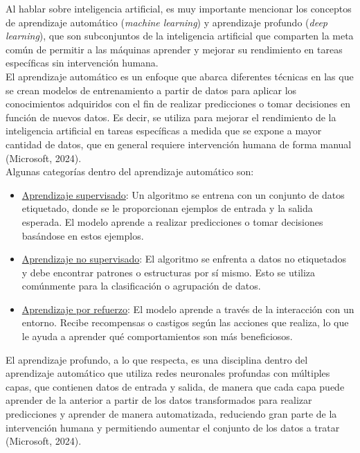 Al hablar sobre inteligencia artificial, es muy importante mencionar los conceptos de aprendizaje automático (\textit{machine learning}) y aprendizaje profundo (\textit{deep learning}), que son subconjuntos de la inteligencia artificial que comparten la meta común de permitir a las máquinas aprender y mejorar su rendimiento en tareas específicas sin intervención humana.\\

El aprendizaje automático es un enfoque que abarca diferentes técnicas en las que se crean modelos de entrenamiento a partir de datos para aplicar los conocimientos adquiridos con el fin de realizar predicciones o tomar decisiones en función de nuevos datos. Es decir, se utiliza para mejorar el rendimiento de la inteligencia artificial en tareas específicas a medida que se expone a mayor cantidad de datos, que en general requiere intervención humana de forma manual (Microsoft, 2024).\\

Algunas categorías dentro del aprendizaje automático son:
\begin{itemize}
	\item \underline{ Aprendizaje supervisado}: Un algoritmo se entrena con un conjunto de datos etiquetado, donde se le proporcionan ejemplos de entrada y la salida esperada. El modelo aprende a realizar predicciones o tomar decisiones basándose en estos ejemplos.
	\item \underline{ Aprendizaje no supervisado}: El algoritmo se enfrenta a datos no etiquetados y debe encontrar patrones o estructuras por sí mismo. Esto se utiliza comúnmente para la clasificación o agrupación de datos.
	\item \underline{ Aprendizaje por refuerzo}: El modelo aprende a través de la interacción con un entorno. Recibe recompensas o castigos según las acciones que realiza, lo que le ayuda a aprender qué comportamientos son más beneficiosos.\\
\end{itemize}


El aprendizaje profundo, a lo que respecta, es una disciplina dentro del aprendizaje automático que utiliza redes neuronales profundas con múltiples capas, que contienen datos de entrada y salida, de manera que cada capa puede aprender de la anterior a partir de los datos transformados para realizar predicciones y aprender de manera automatizada, reduciendo gran parte de la intervención humana y permitiendo aumentar el conjunto de los datos a tratar (Microsoft, 2024).\\

